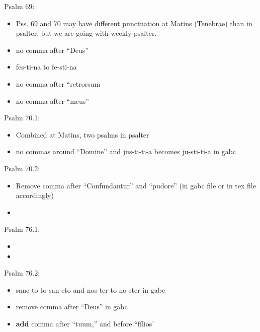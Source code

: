 \documentclass[11pt]{article}
\begin{document}
Psalm 69:
  \begin{itemize}
  \item
  Pss. 69 and 70 may have different punctuation at Matins (Tenebrae) than in psalter, but we are going with weekly psalter.
  \item
  no comma after ``Deus''
  \item
  fes-ti-na to fe-sti-na
  \item no comma after ``retrorsum
  \item  no comma after ``meus''
    \end{itemize}

Psalm 70.1:
  \begin{itemize}
  \item Combined at Matins, two psalms in psalter
  \item  no commas around ``Domine'' and jus-ti-ti-a becomes ju-sti-ti-a in gabc
    \end{itemize}

Psalm 70.2:
  \begin{itemize}
  \item Remove comma after ``Confundantur'' and ``pudore'' (in gabc file or in tex file accordingly)
  \item  
    \end{itemize}


Psalm 76.1:
  \begin{itemize}
  \item 
  \item  
    \end{itemize}

Psalm 76.2:
  \begin{itemize}
  \item sanc-to to san-cto and nos-ter to no-ster in gabc
  \item  remove comma after ``Deus'' in gabc
  \item \textbf{add} comma after ``tuum,'' and before ``fílios'
    \end{itemize}
\end{document}
